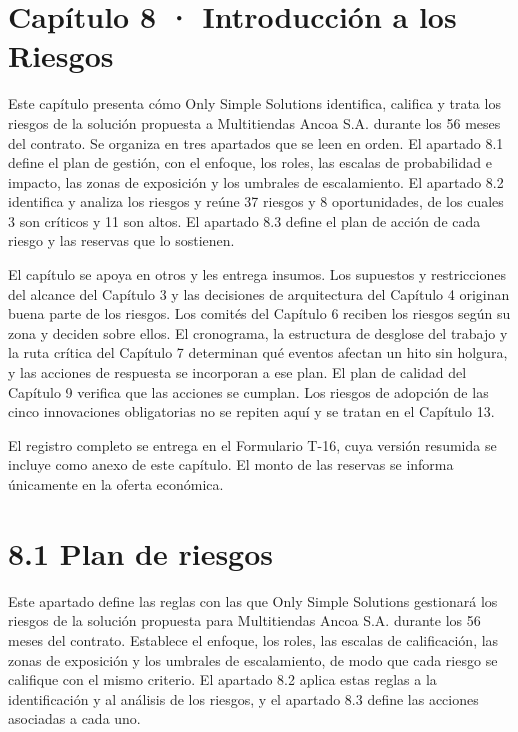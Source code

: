 \documentclass[11pt]{article}
\begin{document}
\tableofcontents
\clearpage

\section{Capítulo 8 · Introducción a los Riesgos}\label{capuxedtulo-8-introducciuxf3n-a-los-riesgos}

Este capítulo presenta cómo Only Simple Solutions identifica, califica y trata los riesgos de la solución propuesta a Multitiendas Ancoa S.A. durante los 56 meses del contrato. Se organiza en tres apartados que se leen en orden. El apartado 8.1 define el plan de gestión, con el enfoque, los roles, las escalas de probabilidad e impacto, las zonas de exposición y los umbrales de escalamiento. El apartado 8.2 identifica y analiza los riesgos y reúne 37 riesgos y 8 oportunidades, de los cuales 3 son críticos y 11 son altos. El apartado 8.3 define el plan de acción de cada riesgo y las reservas que lo sostienen.

El capítulo se apoya en otros y les entrega insumos. Los supuestos y restricciones del alcance del Capítulo 3 y las decisiones de arquitectura del Capítulo 4 originan buena parte de los riesgos. Los comités del Capítulo 6 reciben los riesgos según su zona y deciden sobre ellos. El cronograma, la estructura de desglose del trabajo y la ruta crítica del Capítulo 7 determinan qué eventos afectan un hito sin holgura, y las acciones de respuesta se incorporan a ese plan. El plan de calidad del Capítulo 9 verifica que las acciones se cumplan. Los riesgos de adopción de las cinco innovaciones obligatorias no se repiten aquí y se tratan en el Capítulo 13.

El registro completo se entrega en el Formulario T-16, cuya versión resumida se incluye como anexo de este capítulo. El monto de las reservas se informa únicamente en la oferta económica.

\section{8.1 Plan de riesgos}\label{plan-de-riesgos}

Este apartado define las reglas con las que Only Simple Solutions gestionará los riesgos de la solución propuesta para Multitiendas Ancoa S.A. durante los 56 meses del contrato. Establece el enfoque, los roles, las escalas de calificación, las zonas de exposición y los umbrales de escalamiento, de modo que cada riesgo se califique con el mismo criterio. El apartado 8.2 aplica estas reglas a la identificación y al análisis de los riesgos, y el apartado 8.3 define las acciones asociadas a cada uno.
\end{document}
